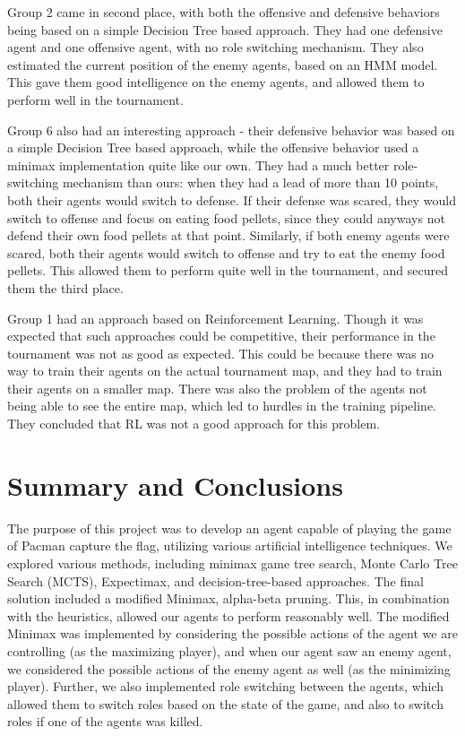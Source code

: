 \documentclass[a4paper,12pt]{article}
\begin{document}
Group 2 came in second place, with both the offensive and defensive behaviors being based on a simple Decision Tree based approach. They had one defensive agent and one offensive agent, with no role switching mechanism. They also estimated the current position of the enemy agents, based on an HMM model. This gave them good intelligence on the enemy agents, and allowed them to perform well in the tournament.

Group 6 also had an interesting approach - their defensive behavior was based on a simple Decision Tree based approach, while the offensive behavior used a minimax implementation quite like our own. They had a much better role-switching mechanism than ours: when they had a lead of more than 10 points, both their agents would switch to defense. If their defense was scared, they would switch to offense and focus on eating food pellets, since they could anyways not defend their own food pellets at that point. Similarly, if both enemy agents were scared, both their agents would switch to offense and try to eat the enemy food pellets. This allowed them to perform quite well in the tournament, and secured them the third place.

Group 1 had an approach based on Reinforcement Learning. Though it was expected that such approaches could be competitive, their performance in the tournament was not as good as expected. This could be because there was no way to train their agents on the actual tournament map, and they had to train their agents on a smaller map. There was also the problem of the agents not being able to see the entire map, which led to hurdles in the training pipeline. They concluded that RL was not a good approach for this problem.

\section{Summary and Conclusions}
\label{sec:conclusion}

The purpose of this project was to develop an agent capable of playing the game of Pacman capture the flag, utilizing various artificial intelligence techniques. 
We explored various methods, including minimax game tree search, Monte Carlo Tree Search (MCTS), Expectimax, and decision-tree-based approaches. 
The final solution included a modified Minimax, alpha-beta pruning. This, in combination with the heuristics, allowed our agents to perform reasonably well.
The modified Minimax was implemented by considering the possible actions of the agent we are controlling (as the maximizing player), and when our agent saw an enemy agent, we considered the possible actions of the enemy agent as well (as the minimizing player).
Further, we also implemented role switching between the agents, which allowed them to switch roles based on the state of the game, and also to switch roles if one of the agents was killed.
\end{document}
